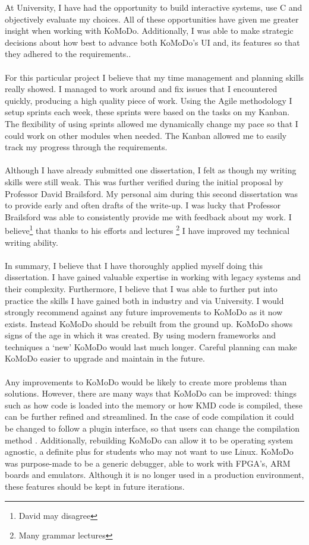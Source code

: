 %
At University, I have had the opportunity to build interactive systems, use C and objectively evaluate my choices. All of these opportunities have given me greater insight when working with KoMoDo. Additionally, I was able to make strategic decisions about how best to advance both KoMoDo's UI and, its features so that they adhered to the requirements..\\\\
%
For this particular project I believe that my time management and planning skills really showed. I managed to work around and fix issues that I encountered quickly, producing a high quality piece of work. Using the Agile methodology I setup sprints each week, these sprints were based on the tasks on my Kanban. The flexibility of using sprints allowed me dynamically change my pace so that I could work on other modules when needed. The Kanban allowed me to easily track my progress through the requirements.\\\\
%
Although I have already submitted one dissertation, I felt as though my writing skills were still weak. This was further verified during the initial proposal by Professor David Brailsford. My personal aim during this second dissertation was to provide early and often drafts of the write-up. I was lucky that Professor Brailsford was able to consistently provide me with feedback about my work. I believe\footnote{David may disagree} that thanks to his efforts and lectures \footnote{Many grammar lectures} I have improved my technical writing ability.\\\\
%
In summary, I believe that I have thoroughly applied myself doing this dissertation. I have gained valuable expertise in working with legacy systems and their complexity. Furthermore, I believe that I was able to further put into practice the skills I have gained both in industry and via University.
%
%
%
I would strongly recommend against any future improvements to KoMoDo as it now exists. Instead KoMoDo should be rebuilt from the ground up. KoMoDo shows signs of the age in which it was created. By using modern frameworks and techniques a `new' KoMoDo would last much longer. Careful planning can make KoMoDo easier to upgrade and maintain in the future.\\\\
%
Any improvements to KoMoDo would be likely to create more problems than solutions. However, there are many ways that KoMoDo can be improved: things such as how code is loaded into the memory or how KMD code is compiled, these can be further refined and streamlined. In the case of code compilation it could be changed to follow a plugin interface, so that users can change the compilation method . Additionally, rebuilding KoMoDo can allow it to be operating system agnostic, a definite plus for students who may not want to use Linux. KoMoDo was purpose-made to be a generic debugger, able to work with FPGA's, ARM boards and emulators. Although it is no longer used in a production environment, these features should be kept in future iterations.
